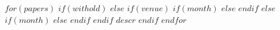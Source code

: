$for(papers)$
$if(withold)$
$else$
$if(venue)$
$if(month)$
$else$
$endif$
$else$
$if(month)$
$else$
$endif$
$endif$
$descr$
\sectionsep
$endif$
$endfor$
